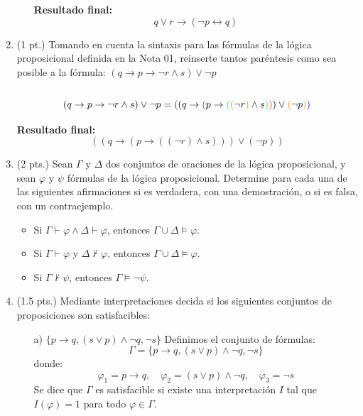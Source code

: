 \documentclass[11pt,letterpaper]{article}
\begin{document}
\begin{enumerate}
\begin{itemize}
      \textbf{Resultado final:}
      \[
      q \lor r \rightarrow (\neg p \leftrightarrow q)
      \]
    \end{itemize}
    
    \bigskip

  \item (1 pt.) Tomando en cuenta la sintaxis para las fórmulas de la lógica proposicional definida en la Nota 01, reinserte tantos paréntesis como sea posible a la fórmula: $(q \rightarrow p \rightarrow \neg r \land s) \lor \neg p$ \\
    \\
    \[
    (q \rightarrow p \rightarrow \neg r \land s) \lor \neg p = \textcolor{blue}{(}(q \rightarrow \textcolor{magenta}{(} p \rightarrow \textcolor{green}{(} \textcolor{orange}{(} \neg r \textcolor{orange}{)} \land s \textcolor{green}{)} \textcolor{magenta}{)}) \lor \textcolor{orange}{(}\neg p \textcolor{orange}{)} \textcolor{blue}{)}
    \]
    
    \textbf{Resultado final:}
    \[
    ((q \rightarrow (p \rightarrow ((\neg r) \land s))) \lor (\neg p))
    \]
    
  \bigskip

  \item (2 pts.) Sean $\Gamma$ y $\Delta$ dos conjuntos de oraciones de la lógica proposicional, y sean $\varphi$ y $\psi$ fórmulas de la lógica proposicional. Determine para cada una de las siguientes afirmaciones si es verdadera, con una demostración, o si es falsa, con un contraejemplo.

    \begin{itemize}
       \item Si $\Gamma \vdash \varphi \land \Delta \vdash \varphi$, entonces $\Gamma \cup \Delta \models \varphi$.
       \item Si $\Gamma \vdash \varphi$ y $\Delta \not\vdash \varphi$, entonces $\Gamma \cup \Delta \models \varphi$.
       \item Si $\Gamma \not\vdash \psi$, entonces $\Gamma \models \neg \psi$.
    \end{itemize}

  \bigskip

  \item (1.5 pts.) Mediante interpretaciones decida si los siguientes conjuntos de proposiciones son satisfacibles:
    \begin{itemize}
       \item[a)] $\{ p \rightarrow q, (s \lor p) \land \neg q, \neg s \}$
         Definimos el conjunto de fórmulas:
         \[
         \Gamma = \{ p \rightarrow q, (s \vee p) \land \neg q, \neg s \}
         \]
         donde:
         \[
         \varphi_1 = p \rightarrow q, \quad \varphi_2 = (s \vee p) \land \neg q, \quad \varphi_3 = \neg s
         \]
         Se dice que $\Gamma$ es satisfacible si existe una interpretación $I$ tal que $I(\varphi) = 1$ para todo $\varphi \in \Gamma$.\\


\end{itemize}
\end{enumerate}
\end{document}
